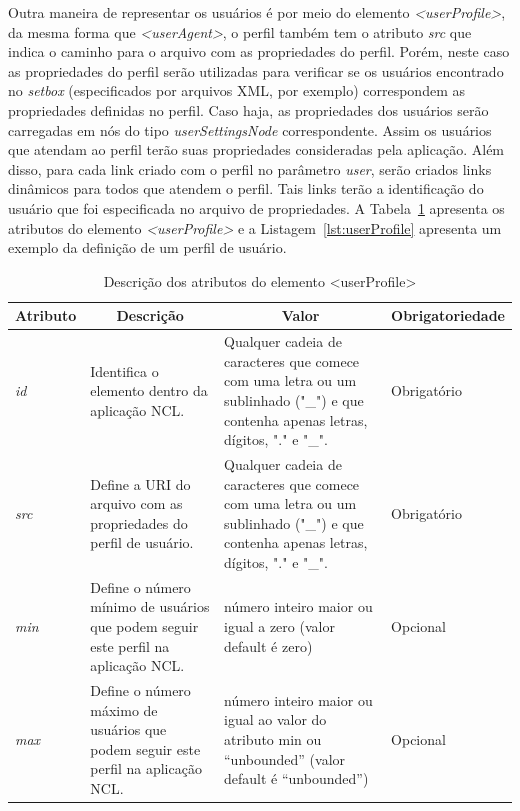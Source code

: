 Outra maneira de representar os usuários é por meio do elemento \textit{<userProfile>}, da mesma forma que \textit{<userAgent>}, o perfil também tem o atributo \textit{src} que indica o caminho para o arquivo com as propriedades do perfil. Porém, neste caso as propriedades do perfil serão utilizadas para verificar se os usuários encontrado no \textit{setbox} (especificados por arquivos XML, por exemplo) correspondem as propriedades definidas no perfil. Caso haja, as propriedades dos usuários serão carregadas em nós do tipo \textit{userSettingsNode} correspondente. Assim os usuários que atendam ao perfil terão suas  propriedades consideradas pela aplicação. Além disso, para cada link criado com o perfil no parâmetro \textit{user}, serão criados links dinâmicos para todos que atendem o perfil. Tais links terão a identificação do usuário que foi especificada no arquivo de propriedades. A Tabela~\ref{tab:atUserProfile} apresenta os atributos do elemento \textit{<userProfile>} e a Listagem~\ref{lst:userProfile} apresenta um exemplo da definição de um perfil de usuário.  

\begin{table}[h]
\caption{Descrição dos atributos do elemento <userProfile>}
\label{tab:atUserProfile}
\centering
{
  \renewcommand\arraystretch{1.25}
  \begin{tabular}{|p{}|p{}|p{5cm}|p{3cm}|} \hline
   \multicolumn{1}{|c|}{Atributo} & \multicolumn{1}{|c|}{Descrição} & \multicolumn{1}{c|}{Valor} & \multicolumn{1}{c|}{Obrigatoriedade} \\ \hline 
    \textit{id} & Identifica o elemento dentro da aplicação NCL. & Qualquer cadeia de caracteres que comece com uma letra ou um sublinhado ("\_") e que contenha apenas letras, dígitos, "." e "\_". & Obrigatório \\  \hline
    \textit{src} & Define a URI do arquivo com as propriedades do perfil de usuário. & Qualquer cadeia de caracteres que comece com uma letra ou um sublinhado ("\_") e que contenha apenas letras, dígitos, "." e "\_". & Obrigatório \\  \hline
    \textit{min} & Define o número mínimo de usuários que podem seguir este perfil na aplicação NCL. & número inteiro maior ou igual a zero (valor default é zero) & Opcional \\  \hline
    \textit{max} & Define o número máximo de usuários que podem seguir este perfil na aplicação NCL. & número inteiro maior ou igual ao valor do atributo min ou ``unbounded'' (valor default é ``unbounded'') & Opcional \\  \hline
  \end{tabular}
}
\end{table}


